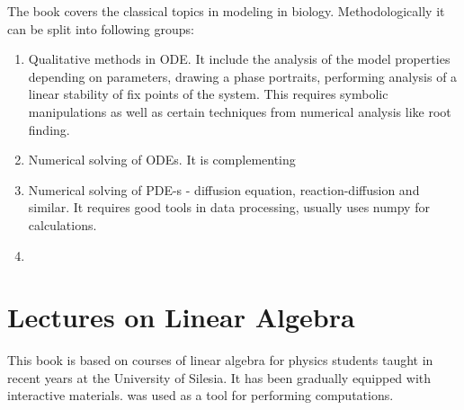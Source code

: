 \documentclass{deliverablereport}
\begin{document}
The book covers the classical topics in modeling in
biology. Methodologically it can be split into following groups:

\begin{enumerate}
\item Qualitative methods in ODE. It include the analysis of the model
  properties depending on parameters, drawing a phase portraits,
  performing analysis of a linear stability of fix points of the
  system. This requires symbolic manipulations as well as certain
  techniques from numerical analysis like root finding. 
  
\item Numerical solving of ODEs. It is complementing
\item Numerical solving of PDE-s - diffusion equation,
  reaction-diffusion and similar. It requires good tools in data
  processing, usually uses numpy for calculations.
\item 
  
\end{enumerate}

\section{Lectures on Linear Algebra}

This book is based on courses of linear algebra for physics students
taught in recent years at the University of Silesia. It has been
gradually equipped with interactive materials. \Sage was used as a
tool for performing computations. 
\end{document}
